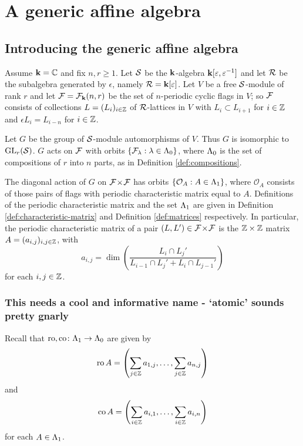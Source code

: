\documentclass[a4paper, 11pt]{report}
\begin{document}
\chapter{A generic affine algebra}

\section{Introducing the generic affine algebra}

Assume $\mathbf{k} = \mathbb{C}$ and fix $n,r\geq 1$. Let $\mathcal{S}$ be the $\mathbf{k}$-algebra $\mathbf{k}[\varepsilon,\varepsilon^{-1}]$ and let $\mathcal{R}$ be the subalgebra generated by $\epsilon$, namely $\mathcal{R}=\mathbf{k}[\varepsilon]$. Let $V$ be a free $\mathcal{S}$-module of rank $r$ and let $\mathcal{F} = \mathcal{F}_{\mathbf{k}}(n,r)$ be the set of $n$-periodic cyclic flags in $V$; so $\mathcal{F}$ consists of collections $L = (L_i)_{i\in\mathbb{Z}}$ of $\mathcal{R}$-lattices in $V$ with $L_i\subset L_{i+1}$ for $i\in\mathbb{Z}$ and $\epsilon L_i = L_{i-n}$ for $i\in\mathbb{Z}$.

Let $G$ be the group of $\mathcal{S}$-module automorphisms of $V$. Thus $G$ is isomorphic to $\operatorname{GL}_{r}(\mathcal{S})$. $G$ acts on $\mathcal{F}$ with orbits $\{\mathcal{F}_\lambda:\lambda\in{\Lambda_0}\}$, where ${\Lambda_0}$ is the set of compositions of $r$ into $n$ parts, as in Definition \ref{def:compositions}.

The diagonal action of $G$ on ${\mathcal{F}\!\times\!\mathcal{F}}$ has orbits $\{\mathcal{O}_A:A\in{\Lambda_1}\}$, where $\mathcal{O}_A$ consists of those pairs of flags with periodic characteristic matrix equal to $A$. Definitions of the periodic characteristic matrix and the set ${\Lambda_1}$ are given in Definition \ref{def:characteristic-matrix} and Definition \ref{def:matrices} respectively. In particular, the periodic characteristic matrix of a pair $(L,L')\in{\mathcal{F}\!\times\!\mathcal{F}}$ is the $\mathbb{Z}\times\mathbb{Z}$ matrix $A = (a_{i,j})_{i,j\in\mathbb{Z}}$, with
\begin{equation*}
a_{i,j} = \dim\left(\frac{L_i\cap L_j'}{L_{i-1}\cap L_j' + L_i\cap L_{j-1}'}\right)
\end{equation*}
for each $i,j\in\mathbb{Z}$.

\subsection{This needs a cool and informative name - `atomic' sounds pretty gnarly}

Recall that $\operatorname{ro},\operatorname{co}\colon{\Lambda_1}\to{\Lambda_0}$ are given by
\begin{equation*}
\operatorname{ro}{A} = \left(\sum_{j\in\mathbb{Z}} a_{1,j},\ldots, \sum_{j\in\mathbb{Z}}a_{n,j}\right)
\end{equation*}
and
\begin{equation*}
\operatorname{co}{A} = \left(\sum_{i\in\mathbb{Z}} a_{i,1},\ldots, \sum_{i\in\mathbb{Z}} a_{i,n}\right)
\end{equation*}
for each $A\in{\Lambda_1}$.
\end{document}
